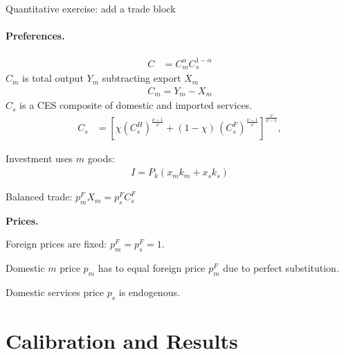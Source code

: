 \documentclass[9pt,xcolor={svgnames}]{beamer}
\begin{document}
\begin{frame}{Quantitative exercise: add a trade block}\label{main:trade}
\paragraph{Preferences.}
\begin{align*}
    C &= C_m^{\alpha}C_s^{1-\alpha}
\end{align*}
$C_m$ is total output $Y_m$ subtracting export $X_m$
\begin{align*}
     C_m  = Y_m - X_m 
\end{align*}
$C_s$ is a CES composite of domestic and imported services.     
   \begin{align*}
    C_s &= [\chi (C_s^{H})^{\frac{\nu-1}\nu} + (1-\chi)\,(C_s^{F})^{\frac{\nu-1}{\nu}}]^{\frac{\nu}{\nu-1}}, 
\end{align*}

Investment uses $m$ goods:  
\begin{align*}
    I = P_k(x_mk_m + x_sk_s) 
\end{align*}

Balanced trade:  $p_m^F X_m = p_s^F C_s^F $

\textbf{Prices.}

Foreign prices are fixed:  $p_m^F = p_s^F = 1$. 

Domestic $m$ price $p_m$ has to equal foreign price $p_m^F$ due to perfect substitution.

Domestic services price $p_s$ is endogenous. 

\hyperlink{app:trade}{}

    
\end{frame}


\section{Calibration and Results}
\end{document}
